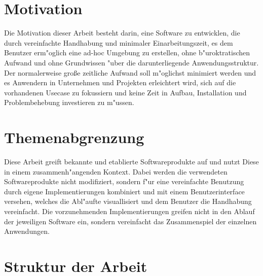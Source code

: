 \section{Motivation}
Die Motivation dieser Arbeit besteht darin, eine Software zu entwicklen, die durch vereinfachte Handhabung und minimaler Einarbeitungszeit, es dem Benutzer erm"oglich eine ad-hoc Umgebung zu erstellen, ohne b"uroktratischen Aufwand und ohne Grundwissen "uber die darunterliegende Anwendungsstruktur.
Der normalerweise gro{\ss}e zeitliche Aufwand soll m"oglichst minimiert werden und es Anwendern in Unternehmen und Projekten erleichtert wird, sich auf die vorhandenen Usecase zu fokussiern und keine Zeit in Aufbau, Installation und Problembehebung investieren zu m"ussen.

\section{Themenabgrenzung}
Diese Arbeit greift bekannte und etablierte Softwareprodukte auf und nutzt Diese in einem zusammenh"angenden Kontext. Dabei werden die verwendeten Softwareprodukte nicht modifiziert, sondern f"ur eine vereinfachte Benutzung durch eigene Implementierungen kombiniert und mit einem Benutzerinterface versehen, welches die Abl"aufte visuallisiert und dem Benutzer die Handhabung vereinfacht.
Die vorzunehmenden Implementierungen greifen nicht in den Ablauf der jeweiligen Software ein, sondern vereinfacht das Zusammenspiel der einzelnen Anwendungen.

\section{Struktur der Arbeit}


